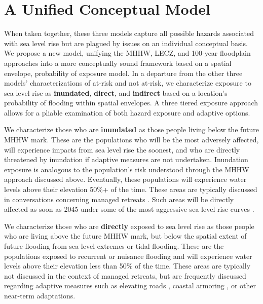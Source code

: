 \documentclass[12pt,]{article}
\begin{document}
\hypertarget{a-unified-conceptual-model}{%
\section{A Unified Conceptual Model}\label{a-unified-conceptual-model}}

When taken together, these three models capture all possible hazards
associated with sea level rise but are plagued by issues on an
individual conceptual basis. We propose a new model, unifying the MHHW,
LECZ, and 100-year floodplain approaches into a more conceptually sound
framework based on a spatial envelope, probability of exposure model. In
a departure from the other three models' characterizations of at-risk
and not at-risk, we characterize exposure to sea level rise as
\textbf{inundated}, \textbf{direct}, and \textbf{indirect} based on a
location's probability of flooding within spatial envelopes. A three
tiered exposure approach allows for a pliable examination of both hazard
exposure and adaptive options.

We characterize those who are \textbf{inundated} as those people living
below the future MHHW mark. These are the populations who will be the
most adversely affected, will experience impacts from sea level rise the
soonest, and who are directly threatened by inundation if adaptive
measures are not undertaken. Inundation exposure is analogous to the
population's risk understood through the MHHW approach discussed above.
Eventually, these populations will experience water levels above their
elevation 50\%+ of the time. These areas are typically discussed in
conversations concerning managed retreats
\citep{huntington2012towards, hino2017managed}. Such areas will be
directly affected as soon as 2045 under some of the most aggressive sea
level rise curves
\citetext{\citealp{deconto2016contribution}; \citealp[@][]{sweet2017global}}.

We characterize those who are \textbf{directly} exposed to sea level
rise as those people who are living above the future MHHW mark, but
below the spatial extent of future flooding from sea level extremes or
tidal flooding. These are the populations exposed to recurrent or
nuisance flooding \citep{chang2010potential, dahl2017sea} and will
experience water levels above their elevation less than 50\% of the
time. These areas are typically not discussed in the context of managed
retreats, but are frequently discussed regarding adaptive measures such
as elevating roads \citep{titus2009state}, coastal armoring
\citep{jin2015shoreline}, or other near-term adaptations.
\end{document}

